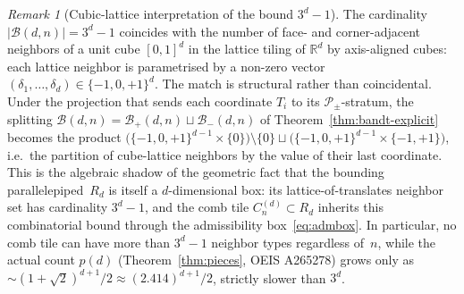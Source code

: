 \documentclass{amsart}
\theoremstyle{definition}
\theoremstyle{remark}
\newtheorem{remark}[theorem]{Remark}
\newcommand{\R}{\mathbb{R}}
\begin{document}
\medskip
\begin{remark}[Cubic-lattice interpretation of the bound $3^d - 1$]
\label{rem:cube-bound}
The cardinality $|\mathcal{B}(d, n)| = 3^d - 1$ coincides with the
number of face- and corner-adjacent neighbors of a unit cube
$[0, 1]^d$ in the lattice tiling of $\R^d$ by axis-aligned cubes:
each lattice neighbor is parametrised by a non-zero vector
$(\delta_1, \ldots, \delta_d) \in \{-1, 0, +1\}^d$.
The match is structural rather than coincidental.  Under the
projection that sends each coordinate $T_i$ to its
$\mathcal{P}_\pm$-stratum, the splitting
$\mathcal{B}(d, n) =
\mathcal{B}_+(d, n) \sqcup \mathcal{B}_-(d, n)$ of
Theorem~\ref{thm:bandt-explicit} becomes the product
$\bigl(\{-1, 0, +1\}^{d-1} \times \{0\}\bigr) \setminus\{0\}
\sqcup \bigl(\{-1, 0, +1\}^{d-1} \times \{-1, +1\}\bigr)$,
i.e.\ the partition of cube-lattice neighbors by the value of
their last coordinate.  This is the algebraic shadow of the
geometric fact that the bounding parallelepiped~$R_d$
is itself
a $d$-dimensional box: its lattice-of-translates neighbor set has
cardinality $3^d - 1$, and the comb tile $C_n^{(d)} \subset R_d$
inherits this combinatorial bound through the admissibility
box~\eqref{eq:admbox}.  In particular, no comb tile can have more
than $3^d - 1$ neighbor types regardless of~$n$, while the actual
count $p(d)$ \textup{(}Theorem~\ref{thm:pieces},
OEIS A265278\textup{)} grows only as
$\sim (1{+}\sqrt{2})^{d+1}/2 \approx (2.414)^{d+1}/2$,
strictly slower than $3^d$.
\end{remark}
\end{document}
